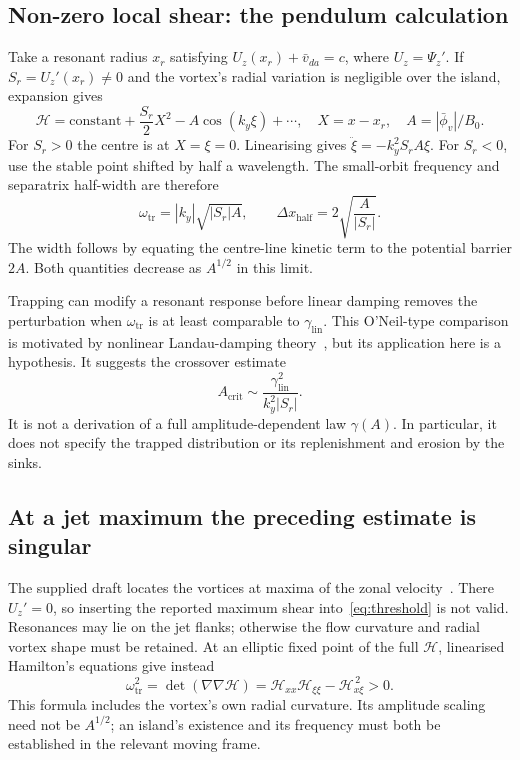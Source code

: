 \documentclass[10pt,a4paper]{article}
\newcommand{\Ham}{\mathcal{H}}
\newcommand{\phibar}{\bar\phi}
\newcommand{\vd}{\bar v_{da}}
\newcommand{\lin}{\mathrm{lin}}
\newcommand{\tr}{\mathrm{tr}}
\begin{document}
\subsection{Non-zero local shear: the pendulum calculation}
Take a resonant radius $x_r$ satisfying $U_z(x_r)+\vd=c$, where $U_z=\Psi_z'$. If $S_r=U_z'(x_r)\ne0$ and the vortex's radial variation is negligible over the island, expansion gives
\begin{equation}
 \Ham=\text{constant}+\frac{S_r}{2}X^2-A\cos(k_y\xi)+\cdots,
 \quad X=x-x_r,\quad A=|\phibar_v|/B_0.
 \label{eq:pendulum}
\end{equation}
For $S_r>0$ the centre is at $X=\xi=0$. Linearising gives
$\ddot\xi=-k_y^2S_rA\xi$. For $S_r<0$, use the stable point shifted by half a wavelength. The small-orbit frequency and separatrix half-width are therefore
\begin{equation}
 \boxed{\omega_\tr=|k_y|\sqrt{|S_r|A},\qquad
 \Delta x_{\mathrm{half}}=2\sqrt{\frac{A}{|S_r|}}.}
 \label{eq:trapping}
\end{equation}
The width follows by equating the centre-line kinetic term to the potential barrier $2A$. Both quantities decrease as $A^{1/2}$ in this limit.

Trapping can modify a resonant response before linear damping removes the perturbation when $\omega_\tr$ is at least comparable to $\gamma_\lin$. This O'Neil-type comparison is motivated by nonlinear Landau-damping theory~\cite{oneil}, but its application here is a hypothesis. It suggests the crossover estimate
\begin{equation}
 \boxed{A_{\mathrm{crit}}\sim\frac{\gamma_\lin^2}{k_y^2|S_r|}.}
 \label{eq:threshold}
\end{equation}
It is not a derivation of a full amplitude-dependent law $\gamma(A)$. In particular, it does not specify the trapped distribution or its replenishment and erosion by the sinks.

\subsection{At a jet maximum the preceding estimate is singular}
The supplied draft locates the vortices at maxima of the zonal velocity~\cite{draft}. There $U_z'=0$, so inserting the reported maximum shear into~\eqref{eq:threshold} is not valid. Resonances may lie on the jet flanks; otherwise the flow curvature and radial vortex shape must be retained. At an elliptic fixed point of the full $\Ham$, linearised Hamilton's equations give instead
\begin{equation}
 \boxed{\omega_\tr^2=\det(\nabla\nabla\Ham)
 =\Ham_{xx}\Ham_{\xi\xi}-\Ham_{x\xi}^{\,2}>0.}
 \label{eq:hessian}
\end{equation}
This formula includes the vortex's own radial curvature. Its amplitude scaling need not be $A^{1/2}$; an island's existence and its frequency must both be established in the relevant moving frame.
\end{document}
